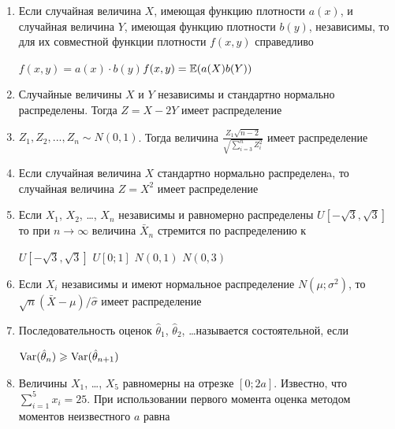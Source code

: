 \documentclass[12pt, a4paper]{article}\usepackage[]{graphicx}\usepackage[]{color}
\begin{document}
\begin{enumerate}
\item Если случайная величина $X$, имеющая функцию плотности $a(x)$, и случайная величина $Y$, имеющая функцию плотности $b(y)$, независимы, то для их совместной функции плотности  $f(x,y)$ справедливо

{$f(x,y)=a(x)\cdot b(y)$}{$f(x,y)=\mathbb{E}(a(X)b(Y))$}


\item Случайные величины $X$ и $Y$ независимы и стандартно нормально распределены. Тогда $Z=X-2Y$ имеет распределение


\item $Z_1,Z_2,...,Z_n\sim N(0,1)$. Тогда величина $\frac{Z_1\sqrt{n-2}}{\sqrt{\sum_{i=3}^n Z_i^2}}$ имеет распределение


\item Если случайная величина $X$ стандартно нормально распределенa, то случайная величина $Z=X^2$ имеет распределение


\item Если $X_1$, $X_2$, \ldots, $X_n$ независимы и равномерно распределены $U[-\sqrt{3},\sqrt{3}]$  то при $n\to\infty$ величина $\bar{X}_n$ стремится по распределению к


{$U[-\sqrt{3},\sqrt{3}]$}
{$U[0;1]$}
{$N(0,1)$}
{$N(0,3)$}

\item Если $X_i$ независимы и имеют нормальное распределение $N(\mu;\sigma^2)$, то $\sqrt{n}(\bar{X}-\mu)/\hat{\sigma}$ имеет распределение


\item Последовательность оценок $\hat{\theta}_1$, $\hat{\theta}_2$, \ldots называется состоятельной, если

{$\operatorname{Var}(\hat{\theta}_n)\geqslant \operatorname{Var}(\hat{\theta}_{n+1})$}

\item Величины $X_1$, \ldots, $X_5$ равномерны на отрезке $[0;2a]$. Известно, что $\sum_{i=1}^5 x_i=25$. При использовании первого момента оценка методом моментов неизвестного $a$ равна


\end{enumerate}
\end{document}
